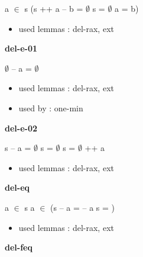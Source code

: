 \documentclass[a4paper]{article}
\begin{document}
 \Fol \Not a $\in$ s \Imp (s ++ a -- b = $\emptyset$ \Equiv s = $\emptyset$ \And a = b)

\begin{itemize}


\item       used lemmas  : del-rax, ext

\end{itemize}

\medskip

\bigskip

{\large\bf del-e-01}

\medskip

 \Fol $\emptyset$ -- a = $\emptyset$

\begin{itemize}


\item       used lemmas  : del-rax, ext
\item       used by      : one-min

\end{itemize}

\medskip

\bigskip

{\large\bf del-e-02}

\medskip

 \Fol s -- a = $\emptyset$ \Equiv s = $\emptyset$ \Or s = $\emptyset$ ++ a

\begin{itemize}


\item       used lemmas  : del-rax, ext

\end{itemize}

\medskip

\bigskip

{\large\bf del-eq}

\medskip

 \Fol a $\in$ s \And a $\in$  \Imp (s -- a =  -- a \Equiv s = )

\begin{itemize}


\item       used lemmas  : del-rax, ext

\end{itemize}

\medskip

\bigskip

{\large\bf del-feq}

\medskip
\end{document}
